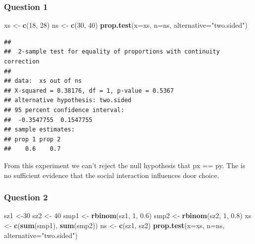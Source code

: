 \documentclass[
]{article}
\newenvironment{Shaded}{\begin{snugshade}}{\end{snugshade}}
\newcommand{\AttributeTok}[1]{\textcolor[rgb]{0.13,0.29,0.53}{#1}}
\newcommand{\DecValTok}[1]{\textcolor[rgb]{0.00,0.00,0.81}{#1}}
\newcommand{\FloatTok}[1]{\textcolor[rgb]{0.00,0.00,0.81}{#1}}
\newcommand{\FunctionTok}[1]{\textcolor[rgb]{0.13,0.29,0.53}{\textbf{#1}}}
\newcommand{\NormalTok}[1]{#1}
\newcommand{\OtherTok}[1]{\textcolor[rgb]{0.56,0.35,0.01}{#1}}
\newcommand{\StringTok}[1]{\textcolor[rgb]{0.31,0.60,0.02}{#1}}
\begin{document}
\subsubsection{Question 1}\label{question-1-1}

\begin{Shaded}
\begin{Highlighting}[]
\NormalTok{xs }\OtherTok{\textless{}{-}} \FunctionTok{c}\NormalTok{(}\DecValTok{18}\NormalTok{, }\DecValTok{28}\NormalTok{)}
\NormalTok{ns }\OtherTok{\textless{}{-}} \FunctionTok{c}\NormalTok{(}\DecValTok{30}\NormalTok{, }\DecValTok{40}\NormalTok{)}
\FunctionTok{prop.test}\NormalTok{(}\AttributeTok{x=}\NormalTok{xs, }\AttributeTok{n=}\NormalTok{ns, }\AttributeTok{alternative=}\StringTok{"two.sided"}\NormalTok{)}
\end{Highlighting}
\end{Shaded}

\begin{verbatim}
## 
##  2-sample test for equality of proportions with continuity correction
## 
## data:  xs out of ns
## X-squared = 0.38176, df = 1, p-value = 0.5367
## alternative hypothesis: two.sided
## 95 percent confidence interval:
##  -0.3547755  0.1547755
## sample estimates:
## prop 1 prop 2 
##    0.6    0.7
\end{verbatim}

From this experiment we can't reject the null hypothesis that px == py.
The is no sufficient evidence that the social interaction influences
door choice.

\subsubsection{Question 2}\label{question-2-1}

\begin{Shaded}
\begin{Highlighting}[]
\NormalTok{sz1 }\OtherTok{\textless{}{-}}\DecValTok{30}
\NormalTok{sz2 }\OtherTok{\textless{}{-}} \DecValTok{40}
\NormalTok{smp1 }\OtherTok{\textless{}{-}} \FunctionTok{rbinom}\NormalTok{(sz1, }\DecValTok{1}\NormalTok{, }\FloatTok{0.6}\NormalTok{)}
\NormalTok{smp2 }\OtherTok{\textless{}{-}} \FunctionTok{rbinom}\NormalTok{(sz2, }\DecValTok{1}\NormalTok{, }\FloatTok{0.8}\NormalTok{)}
\NormalTok{xs }\OtherTok{\textless{}{-}} \FunctionTok{c}\NormalTok{(}\FunctionTok{sum}\NormalTok{(smp1), }\FunctionTok{sum}\NormalTok{(smp2))}
\NormalTok{ns }\OtherTok{\textless{}{-}} \FunctionTok{c}\NormalTok{(sz1, sz2)}
\FunctionTok{prop.test}\NormalTok{(}\AttributeTok{x=}\NormalTok{xs, }\AttributeTok{n=}\NormalTok{ns, }\AttributeTok{alternative=}\StringTok{"two.sided"}\NormalTok{)}
\end{Highlighting}
\end{Shaded}
\end{document}
